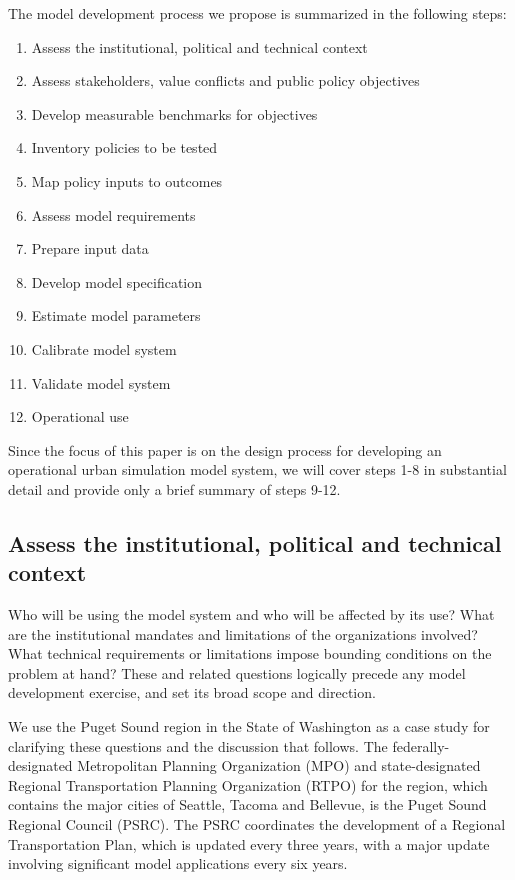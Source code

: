 The model development process we propose is summarized in the following steps:

\begin{enumerate}
\item   Assess the institutional, political and technical context
\item   Assess stakeholders, value conflicts and public policy objectives
\item   Develop measurable benchmarks for objectives
\item   Inventory policies to be tested
\item   Map policy inputs to outcomes
\item   Assess model requirements
\item   Prepare input data
\item   Develop model specification
\item   Estimate model parameters
\item   Calibrate model system
\item   Validate model system
\item   Operational use
\end{enumerate}

Since the focus of this paper is on the design process for developing an operational urban simulation model system, we will cover steps 1-8 in substantial detail and provide only a brief summary of steps 9-12.



\subsection{Assess the institutional, political and technical context}

Who will be using the model system and who will be affected by its use?  What are the institutional mandates and limitations of the organizations involved?  What technical requirements or limitations impose bounding conditions on the problem at hand?  These and related questions logically precede any model development exercise, and set its broad scope and direction.

We use the Puget Sound region in the State of Washington as a case study for clarifying these questions and the discussion that follows.  The federally-designated Metropolitan Planning Organization (MPO) and state-designated Regional Transportation Planning Organization (RTPO) for the region, which contains the major cities of Seattle, Tacoma and Bellevue, is the Puget Sound Regional Council (PSRC).  The PSRC coordinates the development of a Regional Transportation Plan, which is updated every three years, with a major update involving significant model applications every six years.

